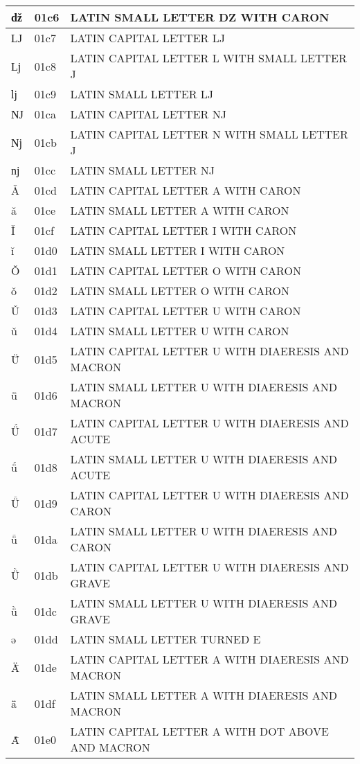 \documentclass[12pt,letterpaper,openany]{book}
\begin{document}
\begin{center}
\begin{supertabular}{|m{0.25in}|m{0.5in}|m{4in}|}
ǆ & 01c6 & LATIN SMALL LETTER DZ WITH CARON\\\hline
Ǉ & 01c7 & LATIN CAPITAL LETTER LJ\\\hline
ǈ & 01c8 & LATIN CAPITAL LETTER L WITH SMALL LETTER J\\\hline
ǉ & 01c9 & LATIN SMALL LETTER LJ\\\hline
Ǌ & 01ca & LATIN CAPITAL LETTER NJ\\\hline
ǋ & 01cb & LATIN CAPITAL LETTER N WITH SMALL LETTER J\\\hline
ǌ & 01cc & LATIN SMALL LETTER NJ\\\hline
Ǎ & 01cd & LATIN CAPITAL LETTER A WITH CARON\\\hline
ǎ & 01ce & LATIN SMALL LETTER A WITH CARON\\\hline
Ǐ & 01cf & LATIN CAPITAL LETTER I WITH CARON\\\hline
ǐ & 01d0 & LATIN SMALL LETTER I WITH CARON\\\hline
Ǒ & 01d1 & LATIN CAPITAL LETTER O WITH CARON\\\hline
ǒ & 01d2 & LATIN SMALL LETTER O WITH CARON\\\hline
Ǔ & 01d3 & LATIN CAPITAL LETTER U WITH CARON\\\hline
ǔ & 01d4 & LATIN SMALL LETTER U WITH CARON\\\hline
Ǖ & 01d5 & LATIN CAPITAL LETTER U WITH DIAERESIS AND MACRON\\\hline
ǖ & 01d6 & LATIN SMALL LETTER U WITH DIAERESIS AND MACRON\\\hline
Ǘ & 01d7 & LATIN CAPITAL LETTER U WITH DIAERESIS AND ACUTE\\\hline
ǘ & 01d8 & LATIN SMALL LETTER U WITH DIAERESIS AND ACUTE\\\hline
Ǚ & 01d9 & LATIN CAPITAL LETTER U WITH DIAERESIS AND CARON\\\hline
ǚ & 01da & LATIN SMALL LETTER U WITH DIAERESIS AND CARON\\\hline
Ǜ & 01db & LATIN CAPITAL LETTER U WITH DIAERESIS AND GRAVE\\\hline
ǜ & 01dc & LATIN SMALL LETTER U WITH DIAERESIS AND GRAVE\\\hline
ǝ & 01dd & LATIN SMALL LETTER TURNED E\\\hline
Ǟ & 01de & LATIN CAPITAL LETTER A WITH DIAERESIS AND MACRON\\\hline
ǟ & 01df & LATIN SMALL LETTER A WITH DIAERESIS AND MACRON\\\hline
Ǡ & 01e0 & LATIN CAPITAL LETTER A WITH DOT ABOVE AND MACRON\\\hline

\end{supertabular}
\end{center}
\end{document}
